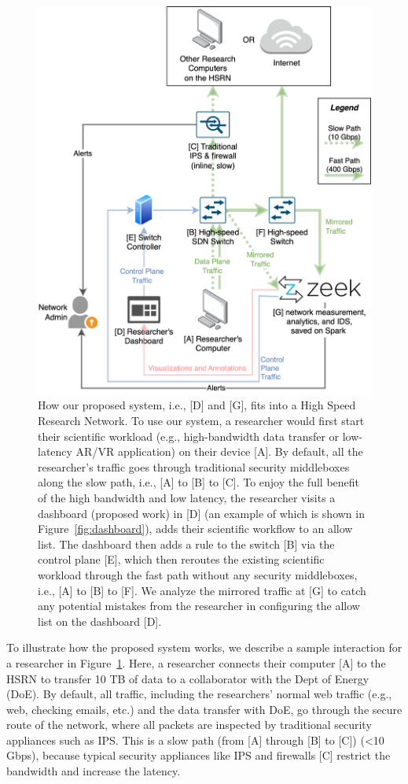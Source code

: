 \begin{figure}[t]
    \centering
    \includegraphics[width=0.6\linewidth]{figures/system.png}
    \caption{How our proposed system, i.e., [D] and [G], fits into a High Speed Research Network. To use our system, a researcher would first start their scientific workload (e.g., high-bandwidth data transfer or low-latency AR/VR application) on their device [A]. By default, all the researcher's traffic goes through traditional security middleboxes along the slow path, i.e., [A] to [B] to [C]. To enjoy the full benefit of the high bandwidth and low latency, the researcher visits a dashboard (proposed work) in [D] (an example of which is shown in Figure~\ref{fig:dashboard}), adds their scientific workflow to an allow list. The dashboard then adds a rule to the switch [B] via the control plane [E], which then reroutes the existing scientific workload through the fast path without any security middleboxes, i.e., [A] to [B] to [F]. We analyze the mirrored traffic at [G] to catch any potential mistakes from the researcher in configuring the allow list on the dashboard [D].}
    \label{fig:system}
\end{figure}

To illustrate how the proposed system works, we describe a sample interaction for a researcher in Figure~\ref{fig:system}. Here, a researcher connects their computer [A] to the HSRN to transfer 10 TB of data to a collaborator with the Dept of Energy (DoE). By default, all traffic, including the researchers' normal web traffic (e.g., web, checking emails, etc.) and the data transfer with DoE, go through the secure route of the network, where all packets are inspected by traditional security appliances such as IPS. This is a slow path (from [A] through [B] to [C]) (<10 Gbps), because  typical security appliances like IPS and firewalls [C] restrict the bandwidth and increase the latency.

